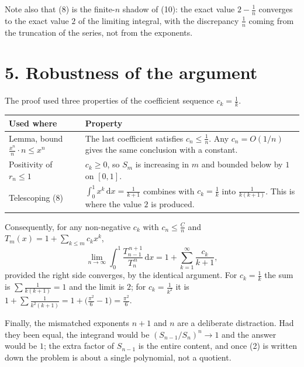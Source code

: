 \documentclass[12pt]{article}
\newcommand{\dd}{\,\mathrm{d}}
\begin{document}
Note also that (8) is the finite-\(n\) shadow of (10): the exact value
\(2-\frac1n\) converges to the exact value \(2\) of the limiting
integral, with the discrepancy \(\frac1n\) coming from the truncation of
the series, not from the exponents.

\section*{5. Robustness of the argument}

The proof used three properties of the coefficient sequence
\(c_k=\frac1k\).

\begin{center}
\small
\renewcommand{\arraystretch}{1.45}
\begin{tabularx}{\textwidth}{@{}>{\raggedright\arraybackslash}p{}X@{}}
\toprule
Used where & Property \\
\midrule
Lemma, bound \(\frac{x^n}{n}\cdot n\le x^n\)
& The last coefficient satisfies \(c_n\le\frac1n\). Any
\(c_n=O(1/n)\) gives the same conclusion with a constant. \\
\addlinespace
Positivity of \(r_n\le1\)
& \(c_k\ge0\), so \(S_m\) is increasing in \(m\) and bounded below by
\(1\) on \([0,1]\). \\
\addlinespace
Telescoping (8)
& \(\int_0^1x^k\dd x=\frac1{k+1}\) combines with \(c_k=\frac1k\) into
\(\frac1{k(k+1)}\). This is where the value \(2\) is produced. \\
\bottomrule
\end{tabularx}
\end{center}

Consequently, for any non-negative \(c_k\) with \(c_n\le\frac{C}{n}\) and
\(T_m(x)=1+\sum_{k\le m}c_kx^k\),
\[
\lim_{n\to\infty}\int_0^1\frac{T_{n-1}^{\,n+1}}{T_n^{\,n}}\dd x
=1+\sum_{k=1}^{\infty}\frac{c_k}{k+1},
\]
provided the right side converges, by the identical argument. For
\(c_k=\frac1k\) the sum is \(\sum\frac1{k(k+1)}=1\) and the limit is
\(2\); for \(c_k=\frac1{k^2}\) it is
\(1+\sum\frac1{k^2(k+1)}=1+\bigl(\frac{\pi^2}{6}-1\bigr)=\frac{\pi^2}{6}\).

Finally, the mismatched exponents \(n+1\) and \(n\) are a deliberate
distraction. Had they been equal, the integrand would be
\((S_{n-1}/S_n)^n\to1\) and the answer would be \(1\); the extra factor
of \(S_{n-1}\) is the entire content, and once (2) is written down the
problem is about a single polynomial, not a quotient.
\end{document}
